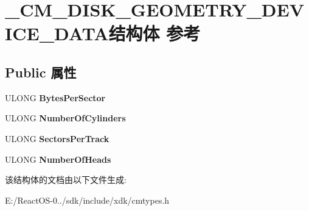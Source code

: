 \hypertarget{struct___c_m___d_i_s_k___g_e_o_m_e_t_r_y___d_e_v_i_c_e___d_a_t_a}{}\section{\+\_\+\+C\+M\+\_\+\+D\+I\+S\+K\+\_\+\+G\+E\+O\+M\+E\+T\+R\+Y\+\_\+\+D\+E\+V\+I\+C\+E\+\_\+\+D\+A\+T\+A结构体 参考}
\label{struct___c_m___d_i_s_k___g_e_o_m_e_t_r_y___d_e_v_i_c_e___d_a_t_a}
\subsection*{Public 属性}
\begin{DoxyCompactItemize}
\item 
\mbox{\label{struct___c_m___d_i_s_k___g_e_o_m_e_t_r_y___d_e_v_i_c_e___d_a_t_a_a27132d486129afa7690eafa4607ebc6e}} 
U\+L\+O\+NG {\bfseries Bytes\+Per\+Sector}
\item 
\mbox{\label{struct___c_m___d_i_s_k___g_e_o_m_e_t_r_y___d_e_v_i_c_e___d_a_t_a_aa693345ad7cb8e42157ce825f681cd6a}} 
U\+L\+O\+NG {\bfseries Number\+Of\+Cylinders}
\item 
\mbox{\label{struct___c_m___d_i_s_k___g_e_o_m_e_t_r_y___d_e_v_i_c_e___d_a_t_a_a9096fb8a81d01ef29160f0ec15f21603}} 
U\+L\+O\+NG {\bfseries Sectors\+Per\+Track}
\item 
\mbox{\label{struct___c_m___d_i_s_k___g_e_o_m_e_t_r_y___d_e_v_i_c_e___d_a_t_a_a2d3429c85157eeb6a33b7ba74de5dda7}} 
U\+L\+O\+NG {\bfseries Number\+Of\+Heads}
\end{DoxyCompactItemize}


该结构体的文档由以下文件生成\+:\begin{DoxyCompactItemize}
\item 
E\+:/\+React\+O\+S-\/0../sdk/include/xdk/cmtypes.\+h\end{DoxyCompactItemize}
